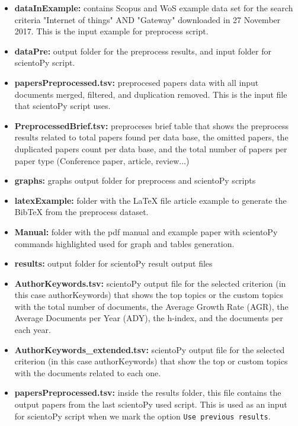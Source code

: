\documentclass[10pt,letterpaper]{article}
\begin{document}
\begin{itemize}
	\item \textbf{dataInExample: } contains Scopus and WoS example data set for the search criteria "Internet of things" AND "Gateway" downloaded in 27 November 2017. This is the input example for preprocess script.
	
	\item \textbf{dataPre: } output folder for the preprocess results, and input folder for scientoPy script.
	
	\item \textbf{papersPreprocessed.tsv: } preprocesed papers data with all input documents merged, filtered, and duplication removed. This is the input file that scientoPy script uses.
	
	\item \textbf{PreprocessedBrief.tsv: } preproceses brief table that shows the preprocess results related to total papers found per data base, the omitted papers, the duplicated papers count per data base, and the total number of papers per paper type (Conference paper, article, review...)
	
	\item \textbf{graphs: } graphs output folder for preprocess and scientoPy scripts

	\item \textbf{latexExample: } folder with the LaTeX file article example to generate the BibTeX from the preprocess dataset. 

	\item \textbf{Manual: } folder with the pdf manual and example paper with scientoPy commands highlighted used for graph and tables generation. 
	
	\item \textbf{results: } output folder for scientoPy result output files
	
	\item \textbf{AuthorKeywords.tsv: } scientoPy output file for the selected criterion (in this case authorKeywords) that shows the top topics or the custom  topics with the total number of documents, the Average Growth Rate (AGR), the Average Documents per Year (ADY), the h-index, and the documents per each year. 
	
	\item \textbf{AuthorKeywords\_extended.tsv: } scientoPy output file for the selected criterion (in this case authorKeywords) that show the top or custom topics with the documents related to each one.
	
	\item \textbf{papersPreprocessed.tsv: } inside the results folder, this file contains the output papers from the last scientoPy used script. This is used as an input for scientoPy script when we mark the option \verb|Use previous results|.
\end{itemize}
\end{document}
